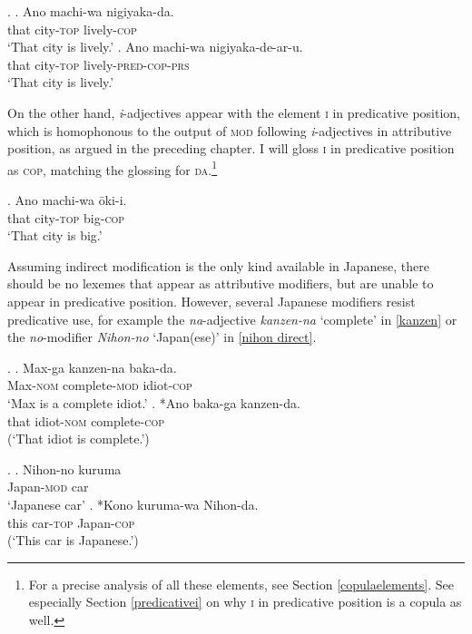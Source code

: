 \ex. \ag. Ano machi-wa nigiyaka-da.\\
that city-\textsc{top} lively-\textsc{cop}\\
`That city is lively.’
\bg. Ano machi-wa nigiyaka-de-ar-u.\\
that city-\textsc{top} lively-\textsc{pred-cop-prs}\\
`That city is lively.’

On the other hand, \textit{i}-adjectives appear with the element \textsc{i} in predicative position, which is homophonous to the output of \textsc{mod} following \textit{i}-adjectives in attributive position, as argued in the preceding chapter. I will gloss \textsc{i} in predicative position as \textsc{cop}, matching the glossing for \textsc{da}.\footnote{For a precise analysis of all these elements, see Section \ref{copulaelements}. See especially Section \ref{predicativei} on why \textsc{i} in predicative position is a copula as well.}

\exg. Ano machi-wa ōki-i.\\
that city-\textsc{top} big-\textsc{cop}\\
`That city is big.’

Assuming indirect modification is the only kind available in Japanese, there should be no lexemes that appear as attributive modifiers, but are unable to appear in predicative position. However, several Japanese modifiers resist predicative use, for example the \textit{na}-adjective \textit{kanzen-na} `complete' in \ref{kanzen} \citep{yamakido:2005:nature} or the \textit{no}-modifier \textit{Nihon-no} `Japan(ese)’ in \ref{nihon direct}.

\ex. \label{kanzen} \ag. Max-ga kanzen-na baka-da.\\
Max-\textsc{nom} complete-\textsc{mod} idiot-\textsc{cop}\\
`Max is a complete idiot.' \hfill \citep[68]{yamakido:2005:nature}
\bg. *Ano baka-ga kanzen-da.\\
that idiot-\textsc{nom} complete-\textsc{cop}\\
(`That idiot is complete.’)

\ex. \label{nihon direct} \ag. Nihon-no kuruma\\
Japan-\textsc{mod} car\\
`Japanese car'
\bg. *Kono kuruma-wa Nihon-da.\\
this car-\textsc{top} Japan-\textsc{cop}\\
(`This car is Japanese.’)

